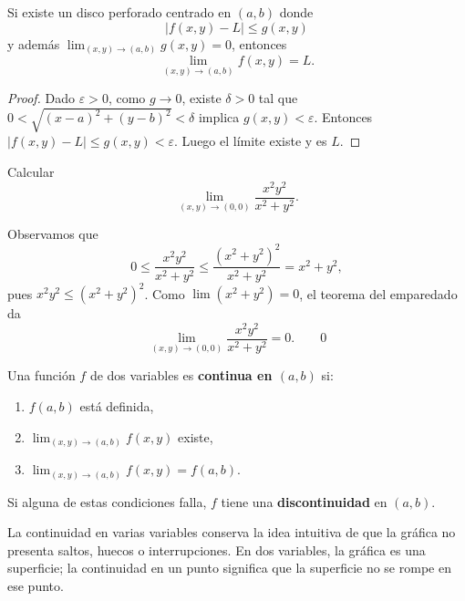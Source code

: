 
\begin{theorem}
Si existe un disco perforado centrado en $(a,b)$ donde
\[
|f(x,y)-L| \leq g(x,y)
\]
y además $\lim_{(x,y)\to(a,b)} g(x,y) = 0$, entonces
\[
\lim_{(x,y)\to(a,b)} f(x,y) = L.
\]
\end{theorem}

\begin{proof}
Dado $\varepsilon>0$, como $g\to 0$, existe $\delta>0$ tal que
$0<\sqrt{(x-a)^2+(y-b)^2}<\delta$ implica $g(x,y)<\varepsilon$.
Entonces $|f(x,y)-L|\leq g(x,y)<\varepsilon$. Luego el límite existe
y es $L$.
\end{proof}

\begin{example}
Calcular
\[
\lim_{(x,y)\to(0,0)} \frac{x^2 y^2}{x^2+y^2}.
\]
\end{example}

\begin{myproof}
Observamos que
\[
0 \leq \frac{x^2 y^2}{x^2+y^2} \leq \frac{(x^2+y^2)^2}{x^2+y^2}
= x^2+y^2,
\]
pues $x^2 y^2 \leq (x^2+y^2)^2$. Como $\lim (x^2+y^2)=0$, el
teorema del emparedado da
\[
\lim_{(x,y)\to(0,0)} \frac{x^2 y^2}{x^2+y^2} = 0.
\qquad\boxed{0}
\]
\end{myproof}


\begin{definition}
Una función $f$ de dos variables es \textbf{continua en $(a,b)$} si:
\begin{enumerate}
    \item $f(a,b)$ está definida,
    \item $\lim_{(x,y)\to(a,b)} f(x,y)$ existe,
    \item $\lim_{(x,y)\to(a,b)} f(x,y) = f(a,b)$.
\end{enumerate}
Si alguna de estas condiciones falla, $f$ tiene una \textbf{discontinuidad}
en $(a,b)$.
\end{definition}

La continuidad en varias variables conserva la idea intuitiva de que
la gráfica no presenta saltos, huecos o interrupciones. En dos
variables, la gráfica es una superficie; la continuidad en un punto
significa que la superficie no se rompe en ese punto.

